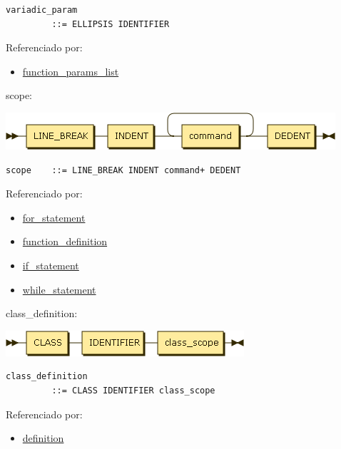 \begin{verbatim}
variadic_param
         ::= ELLIPSIS IDENTIFIER
\end{verbatim}

Referenciado por:

\begin{itemize}
\tightlist
\item
  \protect\hyperlink{function_params_list}{function\_params\_list}
\end{itemize}

\protect\hypertarget{scope}{}{scope:}

\includegraphics[width=4.81250in,height=0.54167in]{diagram/scope.png}

\begin{verbatim}
scope    ::= LINE_BREAK INDENT command+ DEDENT
\end{verbatim}

Referenciado por:

\begin{itemize}
\tightlist
\item
  \protect\hyperlink{for_statement}{for\_statement}
\item
  \protect\hyperlink{function_definition}{function\_definition}
\item
  \protect\hyperlink{if_statement}{if\_statement}
\item
  \protect\hyperlink{while_statement}{while\_statement}
\end{itemize}

\protect\hypertarget{class_definition}{}{class\_definition:}

\includegraphics[width=3.47917in,height=0.37500in]{diagram/class_definition.png}

\begin{verbatim}
class_definition
         ::= CLASS IDENTIFIER class_scope
\end{verbatim}

Referenciado por:

\begin{itemize}
\tightlist
\item
  \protect\hyperlink{definition}{definition}
\end{itemize}


